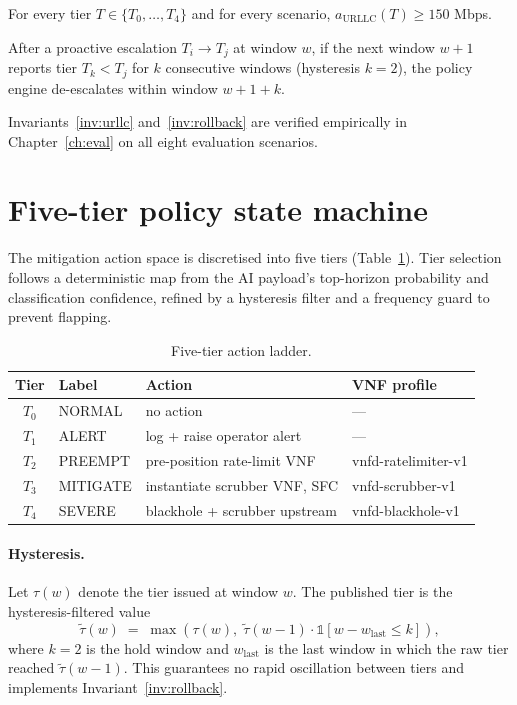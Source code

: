 \begin{invariant}
\label{inv:urllc}
For every tier $T \in \{T_0,\dots,T_4\}$ and for every scenario,
$a_{\text{URLLC}}(T) \geq 150$ Mbps.
\end{invariant}

\begin{invariant}
\label{inv:rollback}
After a proactive escalation $T_i \to T_j$ at window $w$, if the next
window $w+1$ reports tier $T_k < T_j$ for $k$ consecutive windows
(hysteresis $k{=}2$), the policy engine de-escalates within window $w+1+k$.
\end{invariant}

Invariants~\ref{inv:urllc} and~\ref{inv:rollback} are verified empirically
in Chapter~\ref{ch:eval} on all eight evaluation scenarios.

\section{Five-tier policy state machine}
\label{sec:tiers}

The mitigation action space is discretised into five tiers (Table~\ref{tab:tiers}).
Tier selection follows a deterministic map from the AI payload's
top-horizon probability and classification confidence, refined by a
hysteresis filter and a frequency guard to prevent flapping.

\begin{table}[H]
\centering
\small
\caption{Five-tier action ladder.}
\label{tab:tiers}
\begin{tabular}{@{}clll@{}}
\toprule
Tier & Label & Action & VNF profile \\
\midrule
$T_0$ & NORMAL   & no action                       & --- \\
$T_1$ & ALERT    & log + raise operator alert      & --- \\
$T_2$ & PREEMPT  & pre-position rate-limit VNF     & vnfd-ratelimiter-v1 \\
$T_3$ & MITIGATE & instantiate scrubber VNF, SFC   & vnfd-scrubber-v1 \\
$T_4$ & SEVERE   & blackhole + scrubber upstream   & vnfd-blackhole-v1 \\
\bottomrule
\end{tabular}
\end{table}

\paragraph{Hysteresis.}
Let $\tau(w)$ denote the tier issued at window $w$. The published tier is
the hysteresis-filtered value
\[
  \tilde\tau(w) \;=\; \max\!\left(\tau(w),\;\tilde\tau(w-1)\cdot\mathbb{1}[w - w_{\mathrm{last}} \leq k]\right),
\]
where $k{=}2$ is the hold window and $w_{\mathrm{last}}$ is the last window
in which the raw tier reached $\tilde\tau(w-1)$. This guarantees no rapid
oscillation between tiers and implements Invariant~\ref{inv:rollback}.

